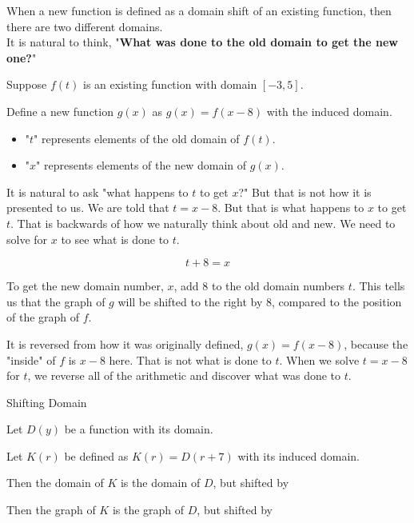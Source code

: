 \documentclass{ximera}
\begin{document}
When a new function is defined as a domain shift of an existing function, then there are two different domains.  \\


It is natural to think, "\textbf{\textcolor{purple!85!blue}{What was done to the old domain to get the new one?}}"

Suppose $f(t)$ is an existing function with domain $[-3, 5]$.

Define a new function $g(x)$ as $g(x) = f(x-8)$ with the induced domain.



\begin{itemize}
\item "$t$" represents elements of the old domain of $f(t)$.  
\item "$x$" represents elements of the new domain of $g(x)$.  
\end{itemize}




It is natural to ask "what happens to $t$ to get $x$?"  But that is not how it is presented to us.  We are told that $t=x-8$.  But that is what happens to $x$ to get $t$.  That is backwards of how we naturally think about old and new.  We need to solve for $x$ to see what is done to $t$.

\[ t+8=x \]

To get the new domain number, $x$, add $8$ to the old domain numbers $t$.  This tells us that the graph of $g$ will be shifted to the right by $8$, compared to the position of the graph of $f$.


It is reversed from how it was originally defined, $g(x) = f(x-8)$, because the "inside" of $f$ is $x-8$ here.  That is not what is done to $t$.  When we solve $t=x-8$ for $t$, we reverse all of the arithmetic and discover what was done to $t$.




\begin{example} Shifting Domain


Let $D(y)$ be a function with its domain.

Let $K(r)$ be defined as $K(r) = D(r+7)$ with its induced domain.


Then the domain of $K$ is the domain of $D$, but shifted  by 


Then the graph of $K$ is the graph of $D$, but shifted  by 




\end{example}
\end{document}
